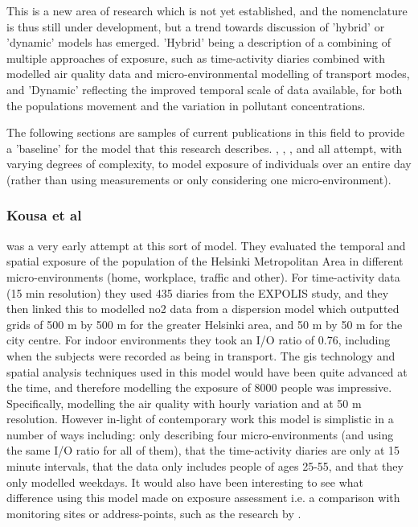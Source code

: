 This is a new area of research which is not yet established, and the nomenclature is thus still under development, but a trend towards discussion of 'hybrid' or 'dynamic' models has emerged. 'Hybrid' being a description of a combining of multiple approaches of exposure, such as time-activity diaries combined with modelled air quality data and micro-environmental modelling of transport modes, and 'Dynamic' reflecting the improved temporal scale of data available, for both the populations movement and the variation in pollutant concentrations. 

The following sections are samples of current publications in this field to provide a 'baseline' for the model that this research describes. \cite{Kousa2002}, \cite{Dhondt2012}, \cite{DeNazelle2013}, \cite{Gerharz2013} and \cite{Reis2018} all attempt, with varying degrees of complexity, to model exposure of individuals over an entire day (rather than using measurements or only considering one micro-environment).


\subsubsection{Kousa et al}
\label{sec:dynamic_models_kousa}

\cite{Kousa2002} was a very early attempt at this sort of model. They evaluated the temporal and spatial exposure of the population of the Helsinki Metropolitan Area in different micro-environments (home, workplace, traffic and other). For time-activity data (15 min resolution) they used 435 diaries from the EXPOLIS study, and they then linked this to modelled \gls{no2} data from a dispersion model which outputted grids of 500 m by 500 m for the greater Helsinki area, and 50 m by 50 m for the city centre. For indoor environments they took an I/O ratio of 0.76, including when the subjects were recorded as being in transport. The \gls{gis} technology and spatial analysis techniques used in this model would have been quite advanced at the time, and therefore modelling the exposure of 8000 people was impressive. Specifically, modelling the air quality with hourly variation and at 50 m resolution. However in-light of contemporary work this model is simplistic in a number of ways including: only describing four micro-environments (and using the same I\slash O ratio for all of them), that the time-activity diaries are only at 15 minute intervals, that the data only includes people of ages 25-55, and that they only modelled weekdays. It would also have been interesting to see what difference using this model made on exposure assessment i.e. a comparison with monitoring sites or address-points, such as the research by \cite{Dhondt2012}.

